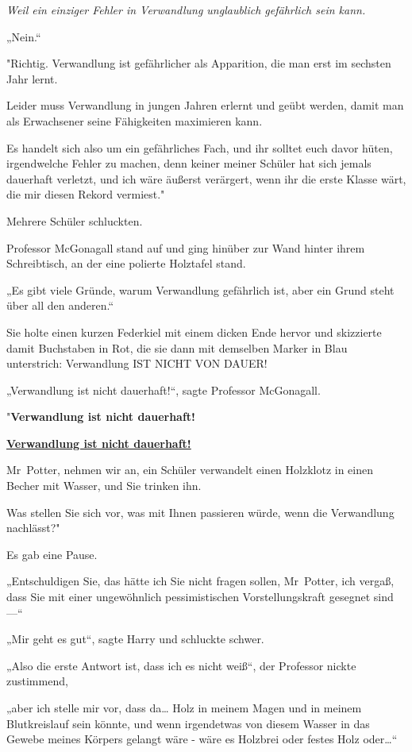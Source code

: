 {\emph{Weil ein einziger Fehler in Verwandlung unglaublich gefährlich sein kann.}

„Nein.“

"Richtig. Verwandlung ist gefährlicher als Apparition, die man erst im sechsten Jahr lernt.

Leider muss Verwandlung in jungen Jahren erlernt und geübt werden, damit man als Erwachsener seine Fähigkeiten maximieren kann.

Es handelt sich also um ein gefährliches Fach, und ihr solltet euch davor hüten, irgendwelche Fehler zu machen, denn keiner meiner Schüler hat sich jemals dauerhaft verletzt, und ich wäre äußerst verärgert, wenn ihr die erste Klasse wärt, die mir diesen Rekord vermiest."

Mehrere Schüler schluckten.

Professor McGonagall stand auf und ging hinüber zur Wand hinter ihrem Schreibtisch, an der eine polierte Holztafel stand.

„Es gibt viele Gründe, warum Verwandlung gefährlich ist, aber ein Grund steht über all den anderen.“

Sie holte einen kurzen Federkiel mit einem dicken Ende hervor und skizzierte damit Buchstaben in Rot, die sie dann mit demselben Marker in Blau unterstrich: Verwandlung IST NICHT VON DAUER!

„Verwandlung ist nicht dauerhaft!“, sagte Professor McGonagall.

"\textbf{Verwandlung ist nicht dauerhaft!}

\textbf{\uline{Verwandlung ist nicht dauerhaft!}}

Mr~Potter, nehmen wir an, ein Schüler verwandelt einen Holzklotz in einen Becher mit Wasser, und Sie trinken ihn.

Was stellen Sie sich vor, was mit Ihnen passieren würde, wenn die Verwandlung nachlässt?"

Es gab eine Pause.

„Entschuldigen Sie, das hätte ich Sie nicht fragen sollen, Mr~Potter, ich vergaß, dass Sie mit einer ungewöhnlich pessimistischen Vorstellungskraft gesegnet sind—“

„Mir geht es gut“, sagte Harry und schluckte schwer.

„Also die erste Antwort ist, dass ich es nicht weiß“, der Professor nickte zustimmend,

„aber ich stelle mir vor, dass da… Holz in meinem Magen und in meinem Blutkreislauf sein könnte, und wenn irgendetwas von diesem Wasser in das Gewebe meines Körpers gelangt wäre - wäre es Holzbrei oder festes Holz oder…“

}
